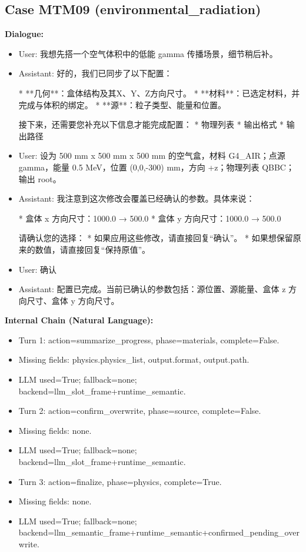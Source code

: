 \documentclass[11pt]{ctexart}
\begin{document}
\subsection{Case MTM09 (environmental\_radiation)}
\textbf{Dialogue:}
\begin{itemize}
\item User: 我想先搭一个空气体积中的低能 gamma 传播场景，细节稍后补。
\item Assistant: 好的，我们已同步了以下配置：

*   **几何**：盒体结构及其X、Y、Z方向尺寸。
*   **材料**：已选定材料，并完成与体积的绑定。
*   **源**：粒子类型、能量和位置。

接下来，还需要您补充以下信息才能完成配置：
*   物理列表
*   输出格式
*   输出路径
\item User: 设为 500 mm x 500 mm x 500 mm 的空气盒，材料 G4\_AIR；点源 gamma，能量 0.5 MeV，位置 (0,0,-300) mm，方向 +z；物理列表 QBBC；输出 root。
\item Assistant: 我注意到这次修改会覆盖已经确认的参数。具体来说：

*   盒体 x 方向尺寸：1000.0 → 500.0
*   盒体 y 方向尺寸：1000.0 → 500.0

请确认您的选择：
*   如果应用这些修改，请直接回复“确认”。
*   如果想保留原来的数值，请直接回复“保持原值”。
\item User: 确认
\item Assistant: 配置已完成。当前已确认的参数包括：源位置、源能量、盒体 z 方向尺寸、盒体 y 方向尺寸。
\end{itemize}
\textbf{Internal Chain (Natural Language):}
\begin{itemize}
\item Turn 1: action=summarize\_progress, phase=materials, complete=False.
\item Missing fields: physics.physics\_list, output.format, output.path.
\item LLM used=True; fallback=none; backend=llm\_slot\_frame+runtime\_semantic.
\item Turn 2: action=confirm\_overwrite, phase=source, complete=False.
\item Missing fields: none.
\item LLM used=True; fallback=none; backend=llm\_slot\_frame+runtime\_semantic.
\item Turn 3: action=finalize, phase=physics, complete=True.
\item Missing fields: none.
\item LLM used=True; fallback=none; backend=llm\_semantic\_frame+runtime\_semantic+confirmed\_pending\_overwrite.
\end{itemize}
\end{document}

